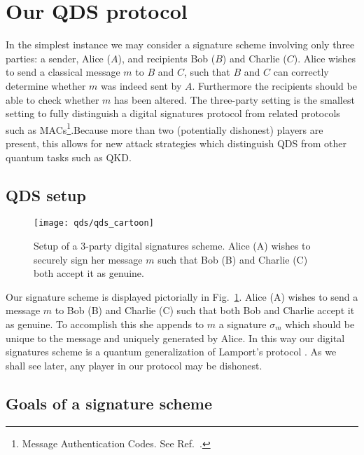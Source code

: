 \section{Our QDS protocol}\label{sec:qds_protocol}

In the simplest instance we may consider a signature scheme involving only three parties: a sender, Alice ($A$), and recipients Bob ($B$) and Charlie ($C$). Alice wishes to send a classical message $m$ to $B$ and $C$, such that $B$ and $C$ can correctly determine whether $m$ was indeed sent by $A$. Furthermore the recipients should be able to check whether $m$ has been altered. The three-party setting is the smallest setting to fully distinguish a digital signatures protocol from related protocols such as MACs\footnote{Message Authentication Codes. See Ref.~\cite{Schneier1996}.}.Because more than two (potentially dishonest) players are present, this allows for new attack strategies which distinguish QDS from other quantum tasks such as QKD.

\subsection{QDS setup}

\begin{figure}[htp]
\centering
\texttt{[image: qds/qds\_cartoon]}
\caption{\label{fig:qds_cartoon} Setup of a $3$-party digital signatures scheme. Alice (A) wishes to securely sign her message $m$ such that Bob (B) and Charlie (C) both accept it as genuine.}
\end{figure}

Our signature scheme is displayed pictorially in Fig.~\ref{fig:qds_cartoon}. Alice (A) wishes to send a message $m$ to Bob (B) and Charlie (C) such that both Bob and Charlie accept it as genuine. To accomplish this she appends to $m$ a signature $\sigma_m$ which should be unique to the message and uniquely generated by Alice. In this way our digital signatures scheme is a quantum generalization of Lamport's protocol \cite{Schneier1996}. As we shall see later, any player in our protocol may be dishonest.

\subsection{Goals of a signature scheme}\label{sec:qds_goals}




